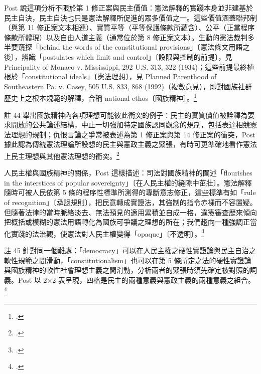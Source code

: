 Post 說這項分析不限於第 1 修正案與民主價值：憲法解釋的實踐本身並非建基於民主自決，民主自決也只是憲法解釋所促進的眾多價值之一。這些價值涵蓋聯邦制（與第 11 修正案文本相連）、實質平等（平等保護條款所蘊含）、公平（正當程序條款所體現）以及自由人道主義（通常位於第 8 修正案文本）。生動的憲法裁判多半要窺探「behind the words of the constitutional provisions」〔憲法條文用語之後〕，辨識「postulates which limit and control」〔設限與控制的前提〕，見 Principality of Monaco v. Mississippi, 292 U.S. 313, 322 (1934)；這些前提最終植根於「constitutional ideals」〔憲法理想〕，見 Planned Parenthood of Southeastern Pa. v. Casey, 505 U.S. 833, 868 (1992)（複數意見），即對國族社群歷史上之根本規範的解釋，合稱 national ethos〔國族精神〕。\footcite[440 \& nn.42--44]{post1998}

註 44 舉出國族精神內各項理想可能彼此衝突的例子：民主的實質價值被詮釋為要求開放的公共論述結構，中止一切強加特定國族認同觀念的規制，包括表達相競憲法理想的規制；仇恨言論之爭常被表述為第 1 修正案與第 14 修正案的衝突，Post 據此認為傳統憲法理論所設想的民主與憲政主義之緊張，有時可更準確地看作憲法上民主理想與其他憲法理想的衝突。\footcite[440 n.44]{post1998}

人民主權與國族精神的關係，Post 這樣描述：司法對國族精神的闡述「flourishes in the interstices of popular sovereignty」〔在人民主權的縫隙中茁壯〕。憲法解釋隨時可被人民依第 5 條的程序性標準所測得的專斷意志修正，這些標準有如「rule of recognition」〔承認規則〕，把民意轉成實證法，其強制的指令赤裸而不容置疑。但隨著法律的當時脈絡淡去、無法預見的適用累積並自成一格，違憲審查歷來傾向把概括或模糊的憲法用語轉化為國族可爭議之理想的所在；我們趨向一種強調正當化實踐的法治觀，使憲法對人民主權變得「opaque」〔不透明〕。\footcite[440--441 \& n.45]{post1998}

註 45 針對同一個難處：「democracy」可以在人民主權之硬性實證論與民主自治之軟性規範之間滑動，「constitutionalism」也可以在第 5 條所定之法的硬性實證論與國族精神的軟性社會理想主義之間滑動，分析兩者的緊張時須先確定被對照的詞義。Post 以 2×2 表呈現，四格是民主的兩種意義與憲政主義的兩種意義之組合。\footcite[441 n.45]{post1998}

